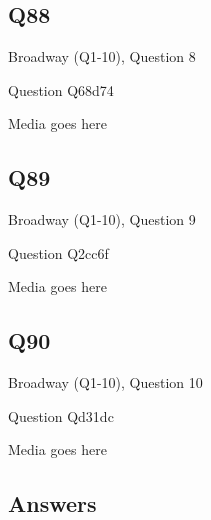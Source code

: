 \documentclass[11pt]{beamer}
\begin{document}
\subsection*{Q88}
\begin{frame}[t]{Broadway (Q1-10), Question 8}
\vspace{2em}
\begin{block}{Question}
Q68d74
\end{block}
\begin{center}
Media goes here
\end{center}
\end{frame}
    

\subsection*{Q89}
\begin{frame}[t]{Broadway (Q1-10), Question 9}
\vspace{2em}
\begin{block}{Question}
Q2cc6f
\end{block}
\begin{center}
Media goes here
\end{center}
\end{frame}
    

\subsection*{Q90}
\begin{frame}[t]{Broadway (Q1-10), Question 10}
\vspace{2em}
\begin{block}{Question}
Qd31dc
\end{block}
\begin{center}
Media goes here
\end{center}
\end{frame}
    
\subsection{Answers}
\end{document}
